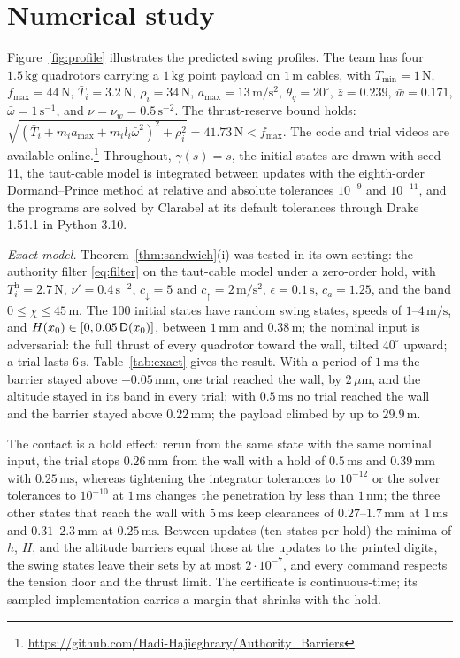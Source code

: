 \section{Numerical study}\label{sec:sim}
Figure~\ref{fig:profile} illustrates the predicted swing profiles. The team has four $1.5\,\mathrm{kg}$ quadrotors carrying a $1\,\mathrm{kg}$ point payload on $1\,\mathrm m$ cables, with $T_{\min}=1\,\mathrm N$, $f_{\max}=44\,\mathrm N$, $\bar T_i=3.2\,\mathrm N$, $\rho_i=34\,\mathrm N$, $a_{\max}=13\,\mathrm{m/s^2}$, $\theta_q=20^\circ$, $\bar z=0.239$, $\bar w=0.171$, $\bar\omega=1\,\mathrm{s^{-1}}$, and $\nu=\nu_w=0.5\,\mathrm{s^{-2}}$. The thrust-reserve bound holds: $\sqrt{(\bar T_i+m_ia_{\max}+m_il_i\bar\omega^2)^2+\rho_i^2}=41.73\,\mathrm N<f_{\max}$. The code and trial videos are available online.\footnote{\url{https://github.com/Hadi-Hajieghrary/Authority_Barriers}} Throughout, $\gamma(s)=s$, the initial states are drawn with seed 11, the taut-cable model is integrated between updates with the eighth-order Dormand--Prince method at relative and absolute tolerances $10^{-9}$ and $10^{-11}$, and the programs are solved by Clarabel at its default tolerances through Drake 1.51.1 in Python 3.10.

\emph{Exact model.} Theorem~\ref{thm:sandwich}(i) was tested in its own setting: the authority filter \eqref{eq:filter} on the taut-cable model under a zero-order hold, with $T^{\mathrm h}_i=2.7\,\mathrm N$, $\nu'=0.4\,\mathrm{s^{-2}}$, $c_\downarrow=5$ and $c_\uparrow=2\,\mathrm{m/s^2}$, $\epsilon=0.1\,\mathrm s$, $c_a=1.25$, and the band $0\le\chi\le45\,\mathrm m$. The 100 initial states have random swing states, speeds of $1$--$4\,\mathrm{m/s}$, and $H(x_0)\in[0,0.05\,\mathsf{D}(x_0)]$, between $1\,\mathrm{mm}$ and $0.38\,\mathrm m$; the nominal input is adversarial: the full thrust of every quadrotor toward the wall, tilted $40^\circ$ upward; a trial lasts $6\,\mathrm s$. Table~\ref{tab:exact} gives the result. With a period of $1\,\mathrm{ms}$ the barrier stayed above $-0.05\,\mathrm{mm}$, one trial reached the wall, by $2\,\mu\mathrm m$, and the altitude stayed in its band in every trial; with $0.5\,\mathrm{ms}$ no trial reached the wall and the barrier stayed above $0.22\,\mathrm{mm}$; the payload climbed by up to $29.9\,\mathrm m$.

The contact is a hold effect: rerun from the same state with the same nominal input, the trial stops $0.26\,\mathrm{mm}$ from the wall with a hold of $0.5\,\mathrm{ms}$ and $0.39\,\mathrm{mm}$ with $0.25\,\mathrm{ms}$, whereas tightening the integrator tolerances to $10^{-12}$ or the solver tolerances to $10^{-10}$ at $1\,\mathrm{ms}$ changes the penetration by less than $1\,\mathrm{nm}$; the three other states that reach the wall with $5\,\mathrm{ms}$ keep clearances of $0.27$--$1.7\,\mathrm{mm}$ at $1\,\mathrm{ms}$ and $0.31$--$2.3\,\mathrm{mm}$ at $0.25\,\mathrm{ms}$. Between updates (ten states per hold) the minima of $h$, $H$, and the altitude barriers equal those at the updates to the printed digits, the swing states leave their sets by at most $2\cdot10^{-7}$, and every command respects the tension floor and the thrust limit. The certificate is continuous-time; its sampled implementation carries a margin that shrinks with the hold.

